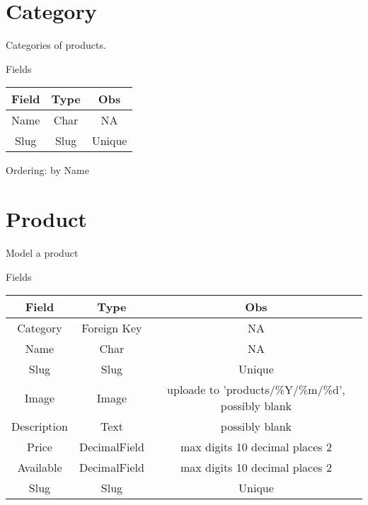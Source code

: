 \section{Category}

Categories of products.

Fields

\begin{center}
	\begin{tabular}{||c c c||} 
		\hline
		Field & Type & Obs \\ [0.5ex] 
		\hline\hline
		Name & Char & NA \\ 
		\hline
		Slug & Slug & Unique \\ [1ex] 
		\hline
	\end{tabular}
\end{center}

Ordering: by Name


\section{Product}

Model a product

Fields

\begin{center}
	\begin{tabular}{||c c c||} 
		\hline
		Field & Type & Obs \\ [0.5ex] 
		\hline\hline
		Category & Foreign Key & NA \\ 
		\hline
		Name & Char & NA \\ 
		\hline
		Slug & Slug & Unique \\
		\hline
		Image & Image & uploade to 'products/\%Y/\%m/\%d', possibly blank \\
		\hline
		Description & Text & possibly blank \\
		\hline
		Price & DecimalField & max digits 10 decimal places 2 \\
		\hline
		Available & DecimalField & max digits 10 decimal places 2 \\
		\hline
		Slug & Slug & Unique \\  [1ex] 
		\hline
	\end{tabular}
\end{center}